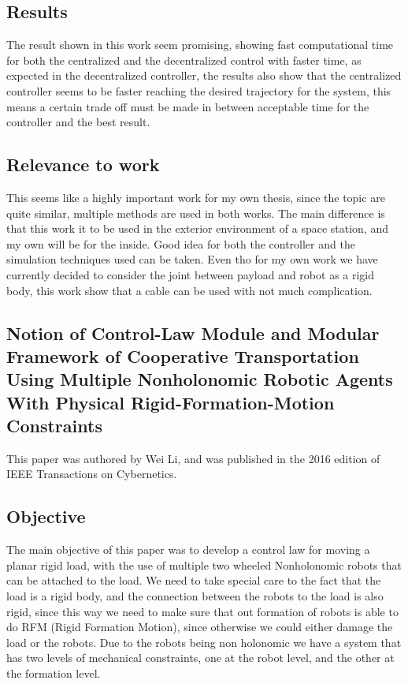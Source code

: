 \documentclass[a4paper,12pt]{article}
\begin{document}
\subsection{Results}
The result shown in this work seem promising, showing fast computational time for both the centralized and the decentralized control with faster time, as expected in the decentralized controller, the results also show that the centralized controller seems to be faster reaching the desired trajectory for the system, this means a certain trade off must be made in between acceptable time for the controller and the best result.

\subsection{Relevance to work}
This seems like a highly important work for my own thesis, since the topic are quite similar, multiple methods are used in both works. The main difference is that this work it to be used in the exterior environment of a space station, and my own will be for the inside. Good idea for both the controller and the simulation techniques used can be taken. Even tho for my own work we have currently decided to consider the joint between payload and robot as a rigid body, this work show that a cable can be used with not much complication.

\begin{adjustwidth}{-1cm}{-1cm}
\section{\small Notion of Control-Law Module and Modular Framework of Cooperative Transportation Using Multiple Nonholonomic Robotic Agents With Physical Rigid-Formation-Motion Constraints}
\end{adjustwidth}

This paper\cite{7140744} was authored by Wei Li, and was published in the 2016 edition of  IEEE Transactions on Cybernetics.

\subsection{Objective}
The main objective of this paper was to develop a control law for moving a planar rigid load, with the use of multiple two wheeled Nonholonomic robots that can be attached to the load. We need to take special care to the fact that the load is a rigid body, and the connection between the robots to the load is also rigid, since this way we need to make sure that out formation of robots is able to do RFM (Rigid Formation Motion), since otherwise we could either damage the load or the robots. Due to the robots being non holonomic we have a system that has two levels of mechanical constraints, one at the robot level, and the other at the formation level.
\end{document}
